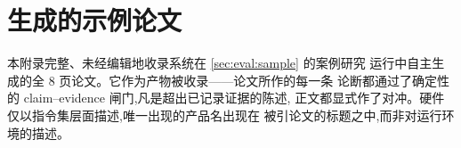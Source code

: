 \section{生成的示例论文}\label{appendix:samplepaper}

本附录完整、未经编辑地收录系统在 \cref{sec:eval:sample} 的案例研究
运行中自主生成的全 8 页论文。它作为产物被收录——论文所作的每一条
论断都通过了确定性的 claim--evidence 闸门,凡是超出已记录证据的陈述,
正文都显式作了对冲。硬件仅以指令集层面描述,唯一出现的产品名出现在
被引论文的标题之中,而非对运行环境的描述。


